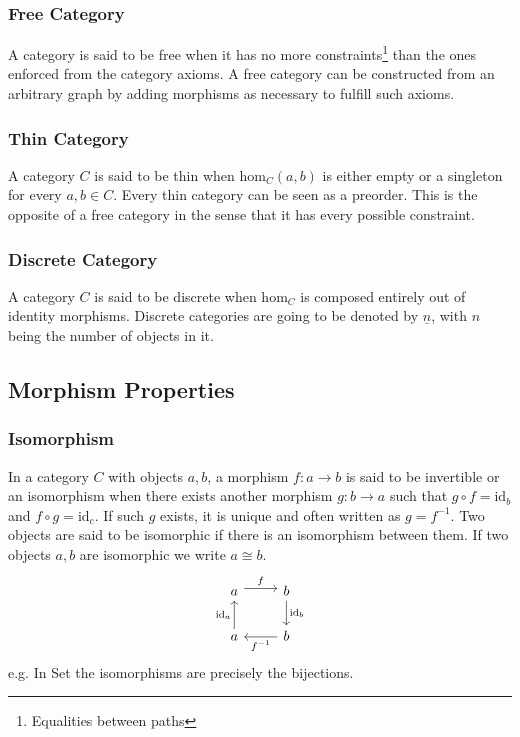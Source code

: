 \subsubsection*{Free Category}
A category is said to be free when it has no more
constraints\footnote{Equalities between paths} than the ones enforced from the
category axioms. \parencite{adamek_herrlich_strecker:joy_cats} A free category
can be constructed from an arbitrary graph by adding morphisms as necessary to
fulfill such axioms.

\subsubsection*{Thin Category}
A category $C$ is said to be thin when $\mathrm{hom}_C(a, b)$ is either empty or
a singleton for every $a,b\in C$. \parencite{adamek_herrlich_strecker:joy_cats}
Every thin category can be seen as a preorder. This is the opposite of a free
category in the sense that it has every possible constraint.

\subsubsection*{Discrete Category}
A category $C$ is said to be discrete when $\mathrm{hom}_C$ is composed entirely
out of identity morphisms. \parencite{awodey:category_theory} Discrete
categories are going to be denoted by $\underline{n}$, with $n$ being the number
of objects in it.

\subsection{Morphism Properties}

\subsubsection*{Isomorphism}
In a category $C$ with objects $a, b$, a morphism $f: a\to b$ is said to be
invertible or an isomorphism when there exists another morphism $g:b \to a$ such
that $g\circ f = \mathrm{id}_b$ and $f\circ g = \mathrm{id}_c$.
\parencite{maclane:working_mathematician}
If such $g$ exists, it is unique and often written as $g= f^{-1}$. Two objects
are said to be isomorphic if there is an isomorphism between them. If two
objects $a,b$ are isomorphic we write $a\cong b$.
\[\begin{tikzcd}
	a & b \\
	a & b
	\arrow["f", shift left=1, from=1-1, to=1-2]
	\arrow["{f^{-1}}", from=2-2, to=2-1]
	\arrow["{\mathrm{id}_a}", from=2-1, to=1-1]
	\arrow["{\mathrm{id}_b}", from=1-2, to=2-2]
\end{tikzcd}\]
e.g. In Set the isomorphisms are precisely the bijections.

